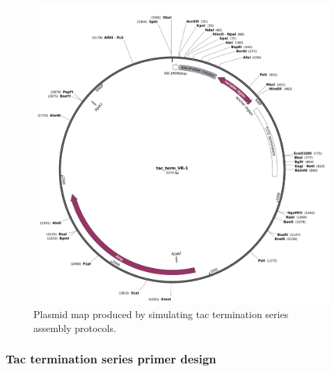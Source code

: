 \documentclass[11pt]{article}
\begin{document}
\begin{figure}[H]
	\includegraphics[width=15cm]{images/plasmid_maps/tac_term_simulated_assembly.png}
	\centering
	\caption{Plasmid map produced by simulating tac termination series assembly protocols.}
\end{figure}

\subsubsection{Tac termination series primer design}
\end{document}
